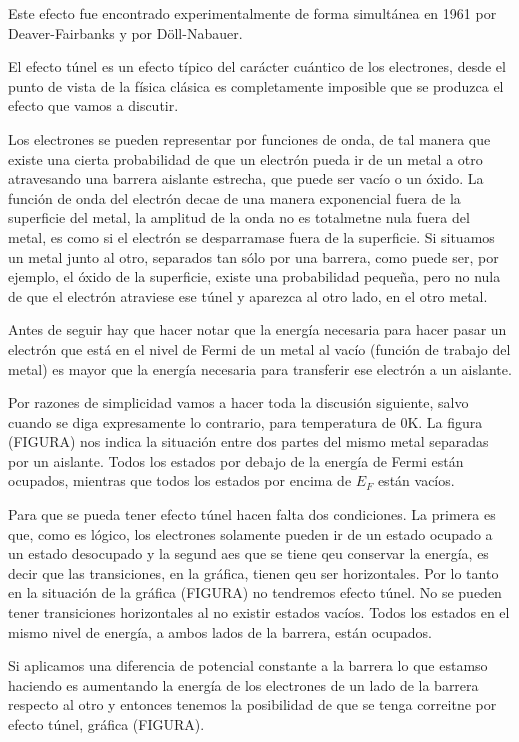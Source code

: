 Este efecto fue encontrado experimentalmente de forma simultánea en 1961 por Deaver-Fairbanks y por Döll-Nabauer.

El efecto túnel es un efecto típico del carácter cuántico de los electrones, desde el punto de vista de la física clásica es completamente imposible que se produzca el efecto que vamos a discutir.

Los electrones se pueden representar por funciones de onda, de tal manera que existe una cierta probabilidad de que un electrón pueda ir de un metal a otro atravesando una barrera aislante estrecha, que puede ser vacío o un óxido. La función de onda del electrón decae de una manera exponencial fuera de la superficie del metal, la amplitud de la onda no es totalmetne nula fuera del metal, es como si el electrón se desparramase fuera de la superficie. Si situamos un metal junto al otro, separados tan sólo por una barrera, como puede ser, por ejemplo, el óxido de la superficie, existe una probabilidad pequeña, pero no nula de que el electrón atraviese ese túnel y aparezca al otro lado, en el otro metal.

Antes de seguir hay que hacer notar que la energía necesaria para hacer pasar un electrón que está en el nivel de Fermi de un metal al vacío (función de trabajo del metal) es mayor que la energía necesaria para transferir ese electrón a un aislante.

Por razones de simplicidad vamos a hacer toda la discusión siguiente, salvo cuando se diga expresamente lo contrario, para temperatura de 0K. La figura (FIGURA) nos indica la situación entre dos partes del mismo metal separadas por un aislante. Todos los estados por debajo de la energía de Fermi están ocupados, mientras que todos los estados por encima de $E_F$ están vacíos.

Para que se pueda tener efecto túnel hacen falta dos condiciones. La primera es que, como es lógico, los electrones solamente pueden ir de un estado ocupado a un estado desocupado y la segund aes que se tiene qeu conservar la energía, es decir que las transiciones, en la gráfica, tienen qeu ser horizontales. Por lo tanto en la situación de la gráfica (FIGURA) no tendremos efecto túnel. No se pueden tener transiciones horizontales al no existir estados vacíos. Todos los estados en el mismo nivel de energía, a ambos lados de la barrera, están ocupados.

Si aplicamos una diferencia de potencial constante a la barrera lo que estamso haciendo es aumentando la energía de los electrones de un lado de la barrera respecto al otro y entonces tenemos la posibilidad de que se tenga correitne por efecto túnel, gráfica (FIGURA).

